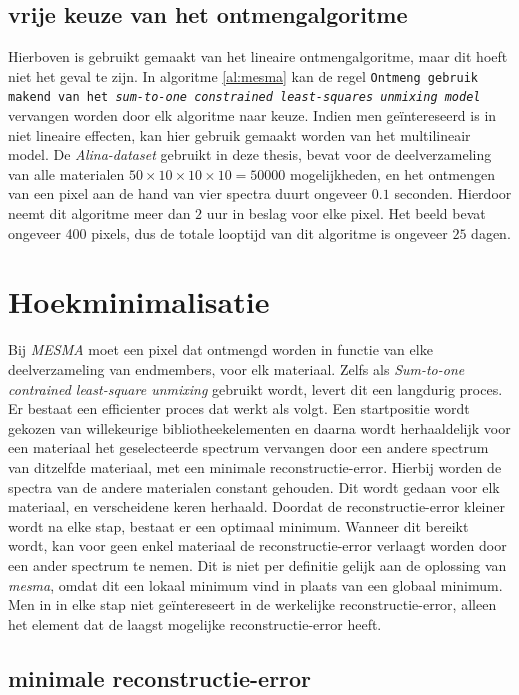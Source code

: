 \documentclass[12pt]{report}
\begin{document}
\subsection{vrije keuze van het ontmengalgoritme}
Hierboven is gebruikt gemaakt van het lineaire ontmengalgoritme, maar dit hoeft niet het geval te zijn. In algoritme \ref{al:mesma} kan de regel \texttt{Ontmeng gebruik makend van het \textit{sum-to-one constrained least-squares unmixing model}} vervangen worden door elk algoritme naar keuze. Indien men ge\"intereseerd is in niet lineaire effecten, kan hier gebruik gemaakt worden van het multilineair model. De \textit{Alina-dataset} gebruikt in deze thesis, bevat voor de deelverzameling van alle materialen $50\times 10\times 10 \times 10= 50000$ mogelijkheden, en het ontmengen van een pixel aan de hand van vier spectra  duurt ongeveer $0.1$ seconden. Hierdoor neemt dit algoritme meer dan $2$ uur in beslag voor elke pixel. Het beeld bevat ongeveer 400 pixels, dus de totale looptijd van dit algoritme is ongeveer $25$ dagen. 

\section{Hoekminimalisatie} \label{sec:AAM}

Bij \textit{MESMA} moet een pixel dat ontmengd worden in functie van elke deelverzameling van endmembers, voor elk materiaal. Zelfs als \textit{Sum-to-one contrained least-square unmixing} gebruikt wordt, levert dit een langdurig proces. Er bestaat een efficienter proces dat werkt als volgt.
Een startpositie wordt gekozen van willekeurige bibliotheekelementen en daarna wordt herhaaldelijk voor een materiaal het geselecteerde spectrum vervangen door een andere spectrum van ditzelfde materiaal, met een minimale reconstructie-error. Hierbij worden de spectra van de andere materialen constant gehouden. Dit wordt gedaan voor elk materiaal, en verscheidene keren herhaald. 
Doordat de reconstructie-error kleiner wordt na elke stap, bestaat er een optimaal minimum. Wanneer dit bereikt wordt, kan voor geen enkel materiaal de reconstructie-error verlaagt worden door een ander spectrum te nemen. Dit is niet per definitie gelijk aan de oplossing van \textit{mesma}, omdat dit een lokaal minimum vind in plaats van een globaal minimum.
Men in in elke stap niet ge\"intereseert in de werkelijke reconstructie-error, alleen het element dat de laagst mogelijke reconstructie-error heeft.

\subsection{minimale reconstructie-error}
\end{document}
